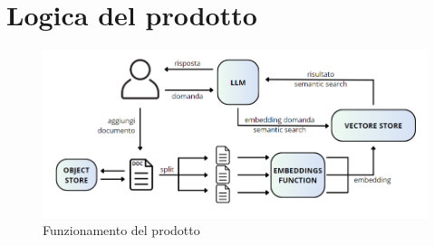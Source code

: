 \section{Logica del prodotto} \label{sec:archlogica}

\begin{figure}[h!]
    \centering  
    \includegraphics[width=\textwidth]{archlogic.png}
    \caption{Funzionamento del prodotto}
\end{figure}

